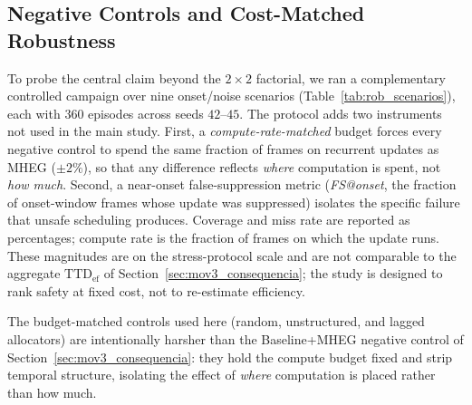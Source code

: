 \subsection{Negative Controls and Cost-Matched Robustness}
\label{sec:robustness_controls}

To probe the central claim beyond the $2{\times}2$ factorial, we ran a
complementary controlled campaign over nine onset/noise scenarios
(Table~\ref{tab:rob_scenarios}), each with $360$ episodes across seeds
$42$--$45$. The protocol adds two instruments not used in the main study.
First, a \emph{compute-rate-matched} budget forces every negative control to
spend the same fraction of frames on recurrent updates as \mbox{MHEG}
($\pm 2\%$), so that any difference reflects \emph{where} computation is
spent, not \emph{how much}. Second, a near-onset false-suppression metric
(\emph{FS@onset}, the fraction of onset-window frames whose update was
suppressed) isolates the specific failure that unsafe scheduling produces.
Coverage and miss rate are reported as percentages; compute rate is the
fraction of frames on which the update runs. These magnitudes are on the
stress-protocol scale and are not comparable to the aggregate
$\mathrm{TTD}_{\mathrm{ef}}$ of Section~\ref{sec:mov3_consequencia}; the study
is designed to rank safety at fixed cost, not to re-estimate efficiency.

The budget-matched controls used here (random, unstructured, and lagged
allocators) are intentionally harsher than the Baseline+MHEG negative control
of Section~\ref{sec:mov3_consequencia}: they hold the compute budget fixed and
strip temporal structure, isolating the effect of \emph{where} computation is
placed rather than how much.

